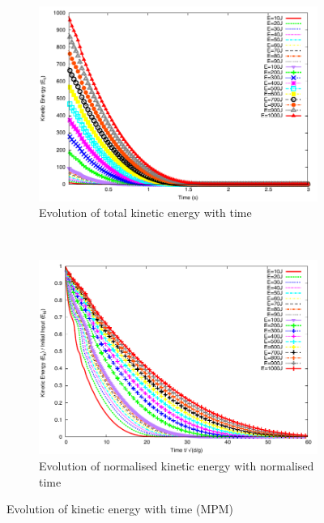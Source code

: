 \begin{figure}[tbhp]
\centering
\begin{subfigure}[b]{0.975\textwidth}
\includegraphics[width=\textwidth]{Energy_Slope}
\caption{Evolution of total kinetic energy with time}
\label{fig:energy_slope}
\end{subfigure}
\\
\begin{subfigure}[b]{0.975\textwidth}
\centering
\includegraphics[width=\textwidth]{Normalised_Energy_Time_Slope}
\caption{Evolution of normalised kinetic energy with normalised time}
\label{fig:Normalised_Energy_Time_Slope}
\end{subfigure}
\caption{Evolution of kinetic energy with time (MPM)}
\label{fig:Energy_Time_Slope}
\end{figure}


